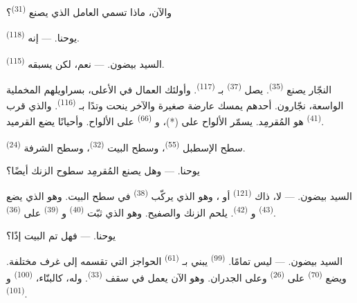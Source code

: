 والآن، ماذا تسمي العامل الذي يصنع  \textsuperscript{(31)}؟

\textsc{يوحنا}. --- إنه  \textsuperscript{(118)}.

\VUsaut{3.0mm}
\VUsaut{3.0mm}

\textsc{السيد بيضون}. --- نعم، لكن يسبقه  \textsuperscript{(115)}.

النجّار يصنع  \textsuperscript{(35)}. يصل 
\textsuperscript{(37)} بـ \textsuperscript{(117)}. وأولئك العمال في
الأعلى، بسراويلهم المخملية الواسعة، نجّارون. أحدهم يمسك عارضة صغيرة
والآخر ينحت وتدًا بـ \textsuperscript{(116)}. والذي قرب
 \textsuperscript{(41)} هو المُقرمِد. يسمّر الألواح على
 (*)، و \textsuperscript{(66)} على الألواح.
وأحيانًا يضع القرميد.


سطح الإسطبل  \textsuperscript{(55)}، وسطح البيت
 \textsuperscript{(32)}، وسطح الشرفة 
\textsuperscript{(24)}.

\textsc{يوحنا}. --- وهل يصنع المُقرمِد سطوح الزنك أيضًا؟

\textsc{السيد بيضون}. --- لا، ذاك  \textsuperscript{(121)} أو
، وهو الذي يركّب  \textsuperscript{(38)} في
سطح البيت. وهو الذي يضع  \textsuperscript{(43)}
و \textsuperscript{(42)}. يلحم الزنك والصفيح. وهو الذي
ثبّت  \textsuperscript{(40)} و
\textsuperscript{(39)} على  \textsuperscript{(36)}.

\textsc{يوحنا}. --- فهل تم البيت إذًا؟

\VUsaut{3.0mm}
\VUsaut{3.0mm}

\textsc{السيد بيضون}. --- ليس تمامًا.  \textsuperscript{(99)}
يبني بـ \textsuperscript{(61)} الحواجز التي تقسمه إلى غرف مختلفة.
ويضع  \textsuperscript{(70)} على 
\textsuperscript{(26)} وعلى الجدران. وهو الآن يعمل في سقف  \textsuperscript{(33)}.
وله، كالبنّاء،  \textsuperscript{(100)} و
\textsuperscript{(101)}.

